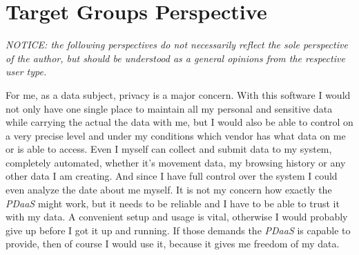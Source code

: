 \documentclass[12pt,english,a4paper,titlepage,cleardoublepage=empty,dottedtoc]{report}
\begin{document}
\section{Target Groups Perspective}\label{target-groups-perspective}

\emph{NOTICE: the following perspectives do not necessarily reflect the
sole perspective of the author, but should be understood as a general
opinions from the respective user type.}

For me, as a data subject, privacy is a major concern. With this
software I would not only have one single place to maintain all my
personal and sensitive data while carrying the actual the data with me,
but I would also be able to control on a very precise level and under my
conditions which vendor has what data on me or is able to access. Even I
myself can collect and submit data to my system, completely automated,
whether it's movement data, my browsing history or any other data I am
creating. And since I have full control over the system I could even
analyze the date about me myself. It is not my concern how exactly the
\emph{PDaaS} might work, but it needs to be reliable and I have to be
able to trust it with my data. A convenient setup and usage is vital,
otherwise I would probably give up before I got it up and running. If
those demands the \emph{PDaaS} is capable to provide, then of course I
would use it, because it gives me freedom of my data.
\end{document}
